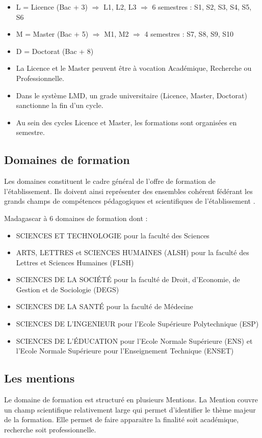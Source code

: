 \begin{itemize}
	\item[\textbullet] L = Licence (Bac + 3) $ \Longrightarrow $ L1, L2, L3 $ \Longrightarrow $ 6 semestres : S1, S2, S3, S4, S5, S6
	\item[\textbullet] M = Master (Bac + 5) $ \Longrightarrow $ M1, M2 $ \Longrightarrow $ 4 semestres : S7, S8, S9, S10
	\item[\textbullet] D = Doctorat (Bac + 8)
\end{itemize}

\begin{itemize}
	\item La Licence et le Master peuvent être à vocation Académique, Recherche ou Professionnelle. 
	\item Dans le système LMD, un grade universitaire (Licence, Master, Doctorat) sanctionne la fin d'un cycle.
	\item Au sein des cycles Licence et Master, les formations sont organisées en semestre.
\end{itemize}

\subsection{Domaines de formation}
Les domaines constituent le cadre général de l'offre de formation de l'établissement. Ils doivent ainsi représenter des ensembles cohérent fédérant les grands champs de compétences pédagogiques et scientifiques de l'établissement \cite{LMD}.

Madagascar à 6 domaines de formation dont : 
\begin{itemize}
	\item SCIENCES ET TECHNOLOGIE pour la faculté des Sciences
	\item ARTS, LETTRES et SCIENCES HUMAINES (ALSH) pour la faculté des Lettres et Sciences Humaines (FLSH)
	\item SCIENCES DE LA SOCIÉTÉ pour la faculté de Droit, d'Economie, de Gestion et de Sociologie (DEGS)
	\item SCIENCES DE LA SANTÉ pour la faculté de Médecine
	\item SCIENCES DE L'INGENIEUR pour l'Ecole Supérieure Polytechnique (ESP)
	\item SCIENCES DE L'ÉDUCATION pour l'Ecole Normale Supérieure (ENS) et l'Ecole Normale Supérieure pour l'Enseignement Technique (ENSET)
\end{itemize}

\subsection{Les mentions}
Le domaine de formation est structuré en plusieurs Mentions.
La Mention couvre un champ scientifique relativement large qui permet d'identifier le thème majeur de la formation. Elle permet de faire apparaitre la finalité soit académique, recherche soit professionnelle.

